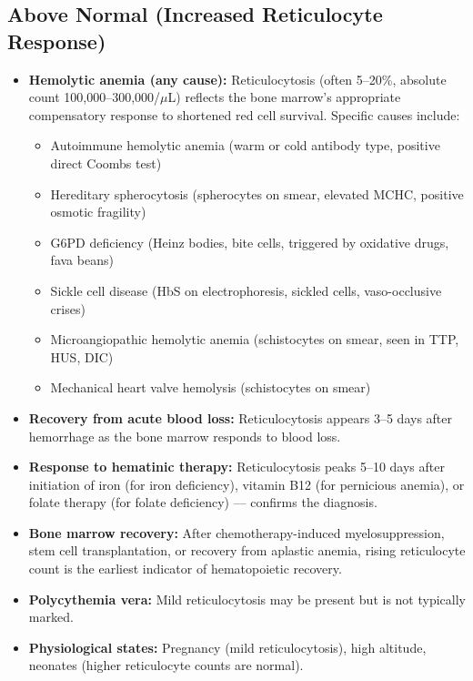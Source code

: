 \subsection*{Above Normal (Increased Reticulocyte Response)}
\begin{itemize}
  \item \textbf{Hemolytic anemia (any cause):} Reticulocytosis (often 5--20\%, absolute count 100,000--300,000/$\mu$L) reflects the bone marrow's appropriate compensatory response to shortened red cell survival. Specific causes include:
  \begin{itemize}
    \item Autoimmune hemolytic anemia (warm or cold antibody type, positive direct Coombs test)
    \item Hereditary spherocytosis (spherocytes on smear, elevated MCHC, positive osmotic fragility)
    \item G6PD deficiency (Heinz bodies, bite cells, triggered by oxidative drugs, fava beans)
    \item Sickle cell disease (HbS on electrophoresis, sickled cells, vaso-occlusive crises)
    \item Microangiopathic hemolytic anemia (schistocytes on smear, seen in TTP, HUS, DIC)
    \item Mechanical heart valve hemolysis (schistocytes on smear)
  \end{itemize}
  \item \textbf{Recovery from acute blood loss:} Reticulocytosis appears 3--5 days after hemorrhage as the bone marrow responds to blood loss.
  \item \textbf{Response to hematinic therapy:} Reticulocytosis peaks 5--10 days after initiation of iron (for iron deficiency), vitamin B12 (for pernicious anemia), or folate therapy (for folate deficiency) --- confirms the diagnosis.
  \item \textbf{Bone marrow recovery:} After chemotherapy-induced myelosuppression, stem cell transplantation, or recovery from aplastic anemia, rising reticulocyte count is the earliest indicator of hematopoietic recovery.
  \item \textbf{Polycythemia vera:} Mild reticulocytosis may be present but is not typically marked.
  \item \textbf{Physiological states:} Pregnancy (mild reticulocytosis), high altitude, neonates (higher reticulocyte counts are normal).
\end{itemize}

